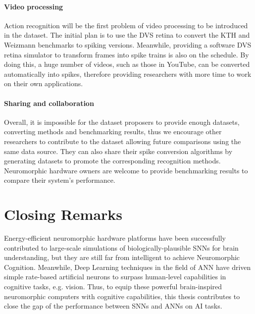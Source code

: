 \paragraph{Video processing}
Action recognition will be the first problem of video processing to be introduced in the dataset.
The initial plan is to use the DVS retina to convert the KTH and Weizmann benchmarks to spiking versions.
Meanwhile, providing a software DVS retina simulator to transform frames into spike trains is also on the schedule.
By doing this, a huge number of videos, such as those in YouTube, can be converted automatically into spikes, therefore providing researchers with more time to work on their own applications.

\paragraph{Sharing and collaboration}
Overall, it is impossible for the dataset proposers to provide enough datasets, converting methods and benchmarking results, thus we encourage other researchers to contribute to the dataset allowing future comparisons using the same data source.
They can also share their spike conversion algorithms by generating datasets to promote the corresponding recognition methods.
Neuromorphic hardware owners are welcome to provide benchmarking results to compare their system's performance.
\section{Closing Remarks}


Energy-efficient neuromorphic hardware platforms have been successfully contributed to large-scale simulations of biologically-plausible SNNs for brain understanding, but they are still far from intelligent to achieve Neuromorphic Cognition.
Meanwhile, Deep Learning techniques in the field of ANN have driven simple rate-based artificial neurons to surpass human-level capabilities in cognitive tasks, e.g. vision.
Thus, to equip these powerful brain-inspired neuromorphic computers with cognitive capabilities, this thesis contributes to close the gap of the performance between SNNs and ANNs on AI tasks.

